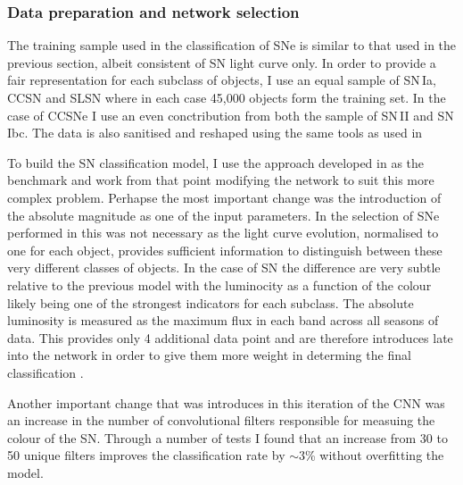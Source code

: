 \subsubsection{Data preparation and network selection} \label{sec:SNClassificationNetwork}
The training sample used in the classification of SNe is similar to that used in the previous section, albeit consistent of SN light curve only. In order to provide a fair representation for each subclass of objects, I use an equal sample of SN\,Ia, CCSN and SLSN where in each case 45,000 objects form the training set. In the case of CCSNe I use an even conctribution from both the sample of SN\,II and SN\,Ibc. The data is also sanitised and reshaped using the same tools as used in 

To build the SN classification model, I use the approach developed in  as the benchmark and work from that point modifying the network to suit this more complex problem. Perhapse the most important change was the introduction of the absolute magnitude as one of the input parameters. In the selection of SNe performed in  this was not necessary as the light curve evolution, normalised to one for each object, provides sufficient information to distinguish between these very different classes of objects. In the case of SN the difference are very subtle relative to the previous model with the luminocity as a function of the colour likely being one of the strongest indicators for each subclass. The absolute luminosity is measured as the maximum flux in each band across all seasons of data. This provides only 4 additional data point and are therefore introduces late into the network in order to give them more weight in determing the final classification .

\begin{figure}
  \caption{}
  \label{fig:SNClassificationNetwork}
\end{figure}

Another important change that was introduces in this iteration of the CNN was an increase in the number of convolutional filters responsible for measuing the colour of the SN. Through a number of tests I found that an increase from 30 to 50 unique filters improves the classification rate by $\sim$3\% without overfitting the model.


